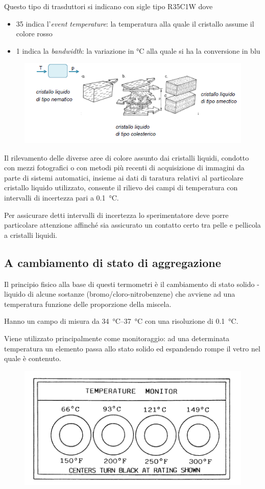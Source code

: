 \documentclass[a4paper, 15pt]{article}
\begin{document}
\begin{adjustwidth}{2in}{}
\begin{itemize}
		Questo tipo di trasduttori si indicano con sigle tipo R35C1W dove
		\begin{itemize}
			\item 35 indica l'\textit{event temperature}: la temperatura alla quale il cristallo assume il colore rosso
			\item 1 indica la \textit{bandwidth}: la variazione in \unit{\celsius} alla quale si ha la conversione in blu
		\end{itemize}
		\begin{figure}[H]
			\centering
			\includegraphics[width=0.5\linewidth]{immagini/screenshot038}
			\label{fig:screenshot038}
		\end{figure}
		Il rilevamento delle diverse aree di colore assunto dai cristalli liquidi, condotto con mezzi fotografici o con metodi più recenti di acquisizione di immagini da parte di sistemi automatici, insieme ai dati di taratura relativi al particolare cristallo liquido utilizzato, consente il rilievo dei campi di temperatura con intervalli di incertezza pari a \SI{0.1}{\celsius}.
		
		Per assicurare detti intervalli di incertezza lo sperimentatore deve porre particolare attenzione affinché sia assicurato un contatto certo tra pelle e pellicola a cristalli liquidi.
	\end{itemize}
\end{adjustwidth}
\subsection{A cambiamento di stato di aggregazione}
\begin{adjustwidth}{2in}{}	
	Il principio fisico alla base di questi termometri è il cambiamento di stato solido - liquido di alcune sostanze (bromo/cloro-nitrobenzene)  che avviene ad una temperatura funzione delle proporzione della miscela. 
	
	Hanno un campo di misura da \SIrange{34}{37}{\celsius} con una risoluzione di \SI{0.1}{\celsius}.
	
	Viene utilizzato principalmente come monitoraggio: ad una determinata temperatura un elemento passa allo stato solido ed espandendo rompe il vetro nel quale è contenuto.
	\begin{figure}[H]
		\centering
		\includegraphics[width=0.5\linewidth]{immagini/screenshot039}
		\label{fig:screenshot039}
	\end{figure}
\end{adjustwidth}
\newpage
\end{document}
